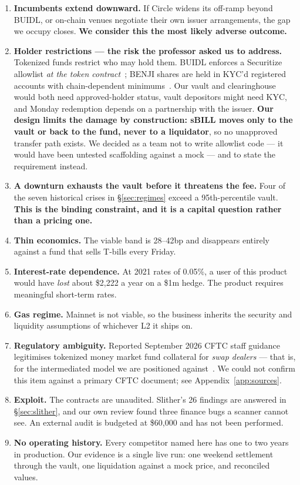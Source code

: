 \documentclass[11pt,a4paper]{article}
\newcommand{\note}[1]{{\small\color{muted}#1}}
\begin{document}
\begin{enumerate}
  \item \textbf{Incumbents extend downward.} If Circle widens its off-ramp beyond BUIDL, or on-chain
  venues negotiate their own issuer arrangements, the gap we occupy closes. \textbf{We consider this
  the most likely adverse outcome.}
  \item \textbf{Holder restrictions --- the risk the professor asked us to address.} Tokenized funds
  restrict who may hold them. BUIDL enforces a Securitize allowlist \emph{at the token
  contract}~\cite{ecokyc,coinpaprika}; BENJI shares are held in KYC'd registered accounts with
  chain-dependent minimums~\cite{franklin}. Our vault and clearinghouse would both need
  approved-holder status, vault depositors might need KYC, and Monday redemption depends on a
  partnership with the issuer. \textbf{Our design limits the damage by construction: sBILL moves only
  to the vault or back to the fund, never to a liquidator}, so no unapproved transfer path exists. We
  decided as a team not to write allowlist code — it would have been untested scaffolding against a
  mock — and to state the requirement instead.
  \item \textbf{A downturn exhausts the vault before it threatens the fee.} Four of the seven
  historical crises in \S\ref{sec:regimes} exceed a 95th-percentile vault. \textbf{This is the
  binding constraint, and it is a capital question rather than a pricing one.}
  \item \textbf{Thin economics.} The viable band is 28--42bp and disappears entirely against a fund
  that sells T-bills every Friday.
  \item \textbf{Interest-rate dependence.} At 2021 rates of 0.05\%, a user of this product would have
  \emph{lost} about \$2,222 a year on a \$1m hedge. The product requires meaningful short-term rates.
  \item \textbf{Gas regime.} Mainnet is not viable, so the business inherits the security and
  liquidity assumptions of whichever L2 it ships on.
  \item \textbf{Regulatory ambiguity.} Reported September 2026 CFTC staff guidance legitimises
  tokenized money market fund collateral for \emph{swap dealers} — that is, for the intermediated
  model we are positioned against~\cite{protofire}. \note{We could not confirm this item against a
  primary CFTC document; see Appendix~\ref{app:sources}.}
  \item \textbf{Exploit.} The contracts are unaudited. Slither's 26 findings are answered in
  \S\ref{sec:slither}, and our own review found three finance bugs a scanner cannot see. An external
  audit is budgeted at \$60,000 and has not been performed.
  \item \textbf{No operating history.} Every competitor named here has one to two years in
  production. Our evidence is a single live run: one weekend settlement through the vault, one
  liquidation against a mock price, and \reconCount{} reconciled values.
\end{enumerate}
\end{document}
